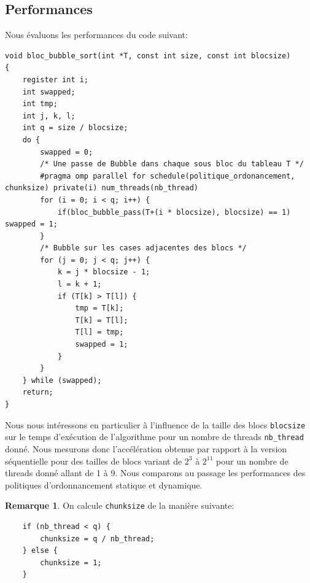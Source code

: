 \documentclass[11pt]{article}
\theoremstyle{definition}
\theoremstyle{definition}
\newtheorem*{myrem}{Remarque}
\theoremstyle{definition}
\begin{document}
\subsection{Performances}
Nous évaluons les performances du code suivant:
\begin{verbatim}
void bloc_bubble_sort(int *T, const int size, const int blocsize)
{
    register int i;
    int swapped;
    int tmp;
    int j, k, l;
    int q = size / blocsize;
    do {
        swapped = 0;
        /* Une passe de Bubble dans chaque sous bloc du tableau T */
        #pragma omp parallel for schedule(politique_ordonancement, chunksize) private(i) num_threads(nb_thread)
        for (i = 0; i < q; i++) {
            if(bloc_bubble_pass(T+(i * blocsize), blocsize) == 1) swapped = 1;
        }
        /* Bubble sur les cases adjacentes des blocs */
        for (j = 0; j < q; j++) {
            k = j * blocsize - 1;
            l = k + 1;
            if (T[k] > T[l]) {
                tmp = T[k];
                T[k] = T[l];
                T[l] = tmp;
                swapped = 1;
            }
        }
    } while (swapped);
    return;
}
\end{verbatim}
Nous nous intéressons en particulier à l'influence de la taille des blocs \texttt{blocsize} sur le temps d'exécution de l'algorithme pour un nombre de threads \texttt{nb\_thread} donné.
Nous mesurons donc l'accélération obtenue par rapport à la version séquentielle pour des tailles
de blocs variant de $2^3$ à $2^{11}$ pour un nombre de threads donné allant de 1 à 9.
Nous comparons au passage les performances des politiques d'ordonnancement statique et dynamique.
\begin{myrem}
  On calcule \texttt{chunksize} de la manière suivante:
 \begin{verbatim}
    if (nb_thread < q) {
        chunksize = q / nb_thread;
    } else {
        chunksize = 1;
    }
 \end{verbatim}
\end{myrem}
\end{document}
